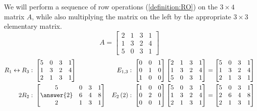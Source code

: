 \documentclass{ximera}
\begin{document}
\begin{example}

  We will perform a sequence of row operations (\ref{definition:RO})
  on the $3\times 4$ matrix $A$, while also multiplying the matrix on
  the left by the appropriate $3\times 3$ elementary matrix.
\[
A=
\begin{bmatrix}
2 & 1 & 3 & 1\\
1 & 3 & 2 & 4\\
5 & 0 & 3 & 1
\end{bmatrix}
\]
\begin{align*}
\rowopswap{1}{3}:\ &
\begin{bmatrix}
5 & 0 & 3 & 1\\
1 & 3 & 2 & 4\\
2 & 1 & 3 & 1
\end{bmatrix}
&
\elemswap{1}{3}:\ &
\begin{bmatrix}
0 & 0 & 1\\
0 & 1 & 0\\
1 & 0 & 0
\end{bmatrix}
\begin{bmatrix}
2 & 1 & 3 & 1\\
1 & 3 & 2 & 4\\
5 & 0 & 3 & 1
\end{bmatrix}
=
\begin{bmatrix}
5 & 0 & 3 & 1\\
1 & 3 & 2 & 4\\
2 & 1 & 3 & 1
\end{bmatrix}\\
\rowopmult{2}{2}:\ &
\begin{bmatrix}
5 & 0 & 3 & 1\\
\answer{2} & 6 & 4 & 8\\
2 & 1 & 3 & 1
\end{bmatrix}
&
\elemmult{2}{2}:\ &
\begin{bmatrix}
1 & 0 & 0\\
0 & 2 & 0\\
0 & 0 & 1
\end{bmatrix}
\begin{bmatrix}
5 & 0 & 3 & 1\\
1 & 3 & 2 & 4\\
2 & 1 & 3 & 1
\end{bmatrix}
=
\begin{bmatrix}
5 & 0 & 3 & 1\\
2 & 6 & 4 & 8\\
2 & 1 & 3 & 1
\end{bmatrix}\\

\end{align*}
\end{example}
\end{document}
